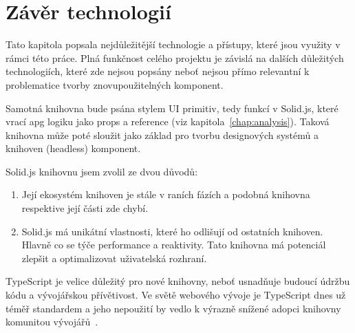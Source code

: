 \section{Závěr technologií}

Tato kapitola popsala nejdůležitější technologie a přístupy, které jsou využity v rámci této práce.
Plná funkčnost celého projektu je závislá na dalších důležitých technologiích, které zde nejsou popsány neboť nejsou přímo relevantní k problematice tvorby znovupoužitelných komponent.

Samotná knihovna bude psána stylem UI primitiv, tedy funkcí v Solid.js, které vrací \gls{apg} logiku jako props a reference (viz kapitola~\ref{chap:analysis}).
Taková knihovna může poté sloužit jako základ pro tvorbu designových systémů a knihoven (headless) komponent.

Solid.js knihovnu jsem zvolil ze dvou důvodů:

\begin{enumerate}
      \item Její ekosystém knihoven je stále v raních fázích a podobná knihovna respektive její části zde chybí.
      \item Solid.js má unikátní vlastnosti, které ho odlišují od ostatních knihoven.
            Hlavně co se týče performance a reaktivity.
            Tato knihovna má potenciál zlepšit a optimalizovat uživatelská rozhraní.
\end{enumerate}

TypeScript je velice důležitý pro nové knihovny, neboť usnadňuje budoucí údržbu kódu a vývojářskou přívětivost.
Ve světě webového vývoje je TypeScript dnes už téměř standardem a jeho nepoužití by vedlo k výrazně snížené adopci knihovny komunitou vývojářů~\cite{stateofjs-2022}.

